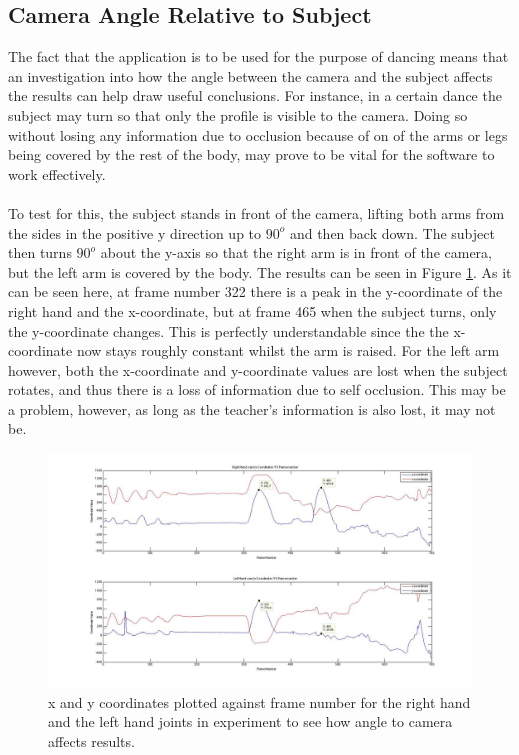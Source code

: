 \documentclass[a4paper]{article}
\begin{document}
\subsection{Camera Angle Relative to Subject}
\noindent 
The fact that the application is to be used for the purpose of dancing means that an investigation into how the angle between the camera and the subject affects the results can help draw useful conclusions. For instance, in a certain dance the subject may turn so that only the profile is visible to the camera. Doing so without losing any information due to occlusion because of on of the arms or legs being covered by the rest of the body, may prove to be vital for the software to work effectively. 
\\\\
\noindent
To test for this, the subject stands in front of the camera, lifting both arms from the sides in the positive y direction up to $90^o$ and then back down. The subject then turns $90^o$ about the y-axis so that the right arm is in front of the camera, but the left arm is covered by the body. The results can be seen in Figure \ref{angle_camera}. As it can be seen here, at frame number 322 there is a peak in the y-coordinate of the right hand and the x-coordinate, but at frame 465 when the subject turns, only the y-coordinate changes. This is perfectly understandable since the the x-coordinate now stays roughly constant whilst the arm is raised. For the left arm however, both the x-coordinate and y-coordinate values are lost when the subject rotates, and thus there is a loss of information due to self occlusion. This may be a problem, however, as long as the teacher's information is also lost, it may not be.  
\begin{figure}[H]
\centering
\includegraphics[scale=0.3]{Angle_To_Camera.jpg}
\caption{x and y coordinates plotted against frame number for the right hand and the left hand joints in experiment to see how angle to camera affects results.}
\label{angle_camera}
\end{figure}
 
\end{document}
